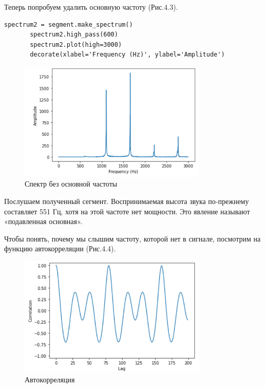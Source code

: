 \documentclass[a4paper,12pt]{report}
\begin{document}
    Теперь попробуем удалить основную частоту (Рис.4.3).
\begin{lstlisting}[caption=Удаление освновной частоты]
       spectrum2 = segment.make_spectrum()
       spectrum2.high_pass(600)
       spectrum2.plot(high=3000)
       decorate(xlabel='Frequency (Hz)', ylabel='Amplitude')
\end{lstlisting}
\begin{figure}[H]
        \centering
        \includegraphics[width=0.8\textwidth]{fig4-3.PNG}
        \caption{Спектр без основной частоты}
        \label{fig:fig4-3}
\end{figure}

    Послушаем полученный сегмент. Воспринимаемая высота звука по-прежнему составляет 551 Гц, хотя на этой частоте нет мощности. Это явление называют «подавленная основная».
    
    Чтобы понять, почему мы слышим частоту, которой нет в сигнале, посмотрим на функцию автокорреляции (Рис.4.4).
\begin{figure}[H]
        \centering
        \includegraphics[width=0.8\textwidth]{fig4-4.PNG}
        \caption{Автокорреляция}
        \label{fig:fig4-4}
\end{figure}
\end{document}

